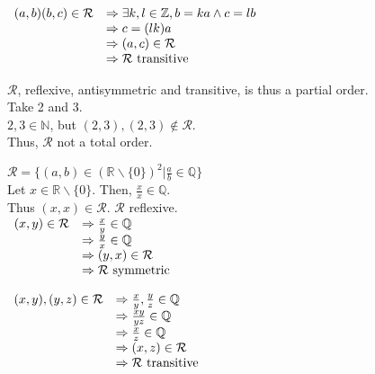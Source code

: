 \documentclass[a4paper, 11pt]{article}
\begin{document}
\begin{myEnumerate}
\begin{myEnumerate}
\begin{myEnumerate}
            \( \begin{array}{llr}
            	(a, b)(b, c)\in \mathcal{R} & \Rightarrow \exists k,l\in \mathbb{Z}, b=ka \land c=lb \\
                & \Rightarrow c=(lk)a \\
                & \Rightarrow (a, c)\in \mathcal{R} \\
                & \Rightarrow \mathcal{R} \textnormal{ transitive}
            \end{array} \\ \)
            
            $\mathcal{R}$, reflexive, antisymmetric and transitive, is thus a partial order. \\
            
            Take 2 and 3. \\
            $2, 3\in \mathbb{N}$, but $(2, 3),(2, 3)\notin \mathcal{R}$. \\
            Thus, $\mathcal{R}$ not a total order. \\
            
        \end{myEnumerate}
        \item $\mathcal{R}= \{(a, b)\in (\mathbb{R}\backslash \{0\})^{2}|\frac{a}{b}\in \mathbb{Q}\}$ \\
        
        Let $x\in \mathbb{R}\backslash \{0\}$. Then, $\frac{x}{x}\in \mathbb{Q}$. \\
        Thus $(x, x)\in \mathcal{R}$. $\mathcal{R}$ reflexive. \\
        
         \( \begin{array}{llr}
            	(x, y)\in \mathcal{R} & \Rightarrow \frac{x}{y}\in \mathbb{Q} \\
                & \Rightarrow \frac{y}{x}\in \mathbb{Q} \\
                & \Rightarrow (y, x)\in \mathcal{R} \\
                & \Rightarrow \mathcal{R} \textnormal{ symmetric}
            \end{array} \\\\ \)
            
         \( \begin{array}{llr}
            	(x, y), (y, z)\in \mathcal{R} & \Rightarrow \frac{x}{y}, \frac{y}{z}\in \mathbb{Q} \\
                & \Rightarrow \frac{xy}{yz}\in \mathbb{Q} \\
                & \Rightarrow \frac{x}{z}\in \mathbb{Q} \\
                & \Rightarrow (x, z)\in \mathcal{R} \\
                & \Rightarrow \mathcal{R} \textnormal{ transitive}
            \end{array} \\ \)
            

\end{myEnumerate}
\end{myEnumerate}
\end{document}
